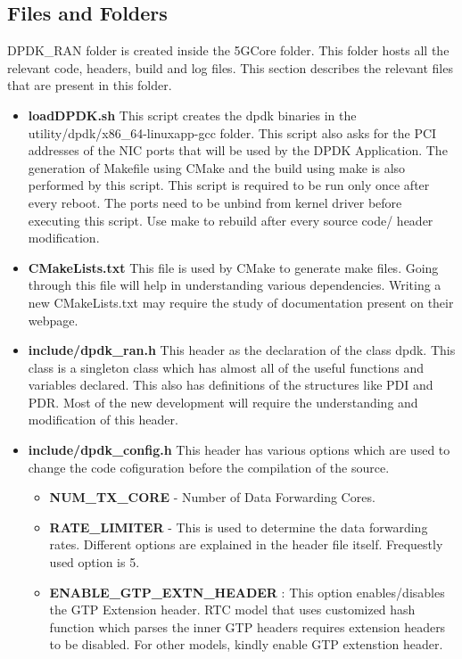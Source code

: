 \documentclass{article}
\begin{document}
\subsection {Files and Folders}
DPDK\_RAN folder is created inside the 5GCore folder. This folder hosts all the relevant code, headers, build and log files.
This section describes the relevant files that are present in this folder.
\begin{itemize}
    \item \textbf{loadDPDK.sh} This script creates the dpdk binaries in the utility/dpdk/x86\_64-linuxapp-gcc folder.
          This script also asks for the PCI addresses of the NIC ports that will be used by the DPDK Application.
          The generation of Makefile using CMake and the build using make is also performed by this script. This script is required to be
          run only once after every reboot. The ports need to be unbind from kernel driver before executing this script. Use make to rebuild after every source code/ header modification.
    \item \textbf{CMakeLists.txt} This file is used by CMake to generate make files. Going through this file will help in understanding various dependencies. Writing a new CMakeLists.txt may require the study of documentation present on their webpage.
    \item \textbf{include/dpdk\_ran.h}
          This header as the declaration of the class dpdk. This class is a singleton class which has almost all of the useful functions
          and variables declared. This also has definitions of the structures like PDI and PDR. Most of the new development will require the
          understanding and modification of this header.
    \item \textbf{include/dpdk\_config.h}
          This header has various options which are used to change the code cofiguration before the compilation of the source.
          \begin{itemize}
              \item \textbf{NUM\_TX\_CORE} - Number of Data Forwarding Cores.
              \item \textbf{RATE\_LIMITER} - This is used to determine the data forwarding rates. Different options are explained in the header file itself. Frequestly used option is 5.
              \item \textbf{ENABLE\_GTP\_EXTN\_HEADER} : This option enables/disables the GTP Extension header. RTC model that uses customized hash function which parses the inner GTP headers requires extension headers to be disabled. For other models, kindly enable GTP extenstion header.

\end{itemize}
\end{itemize}
\end{document}

